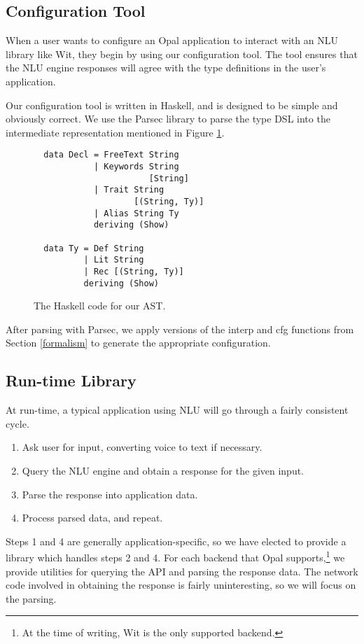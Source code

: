 \documentclass[twocolumn]{article}
\newcommand{\ff}[1]{\textsf{#1}}
\begin{document}
\subsection{Configuration Tool}
When a user wants to configure an Opal application to interact with an NLU
library like Wit, they begin by using our configuration tool. The tool ensures
that the NLU engine responses will agree with the type definitions in the user's
application.

Our configuration tool is written in Haskell, and is designed to be simple and
obviously correct. We use the Parsec library to parse the type DSL into the
intermediate representation mentioned in Figure \ref{fig:hs_ast}.\cite{parsec}

\begin{figure}[H]
\begin{verbatim}
  data Decl = FreeText String
            | Keywords String
                       [String]
            | Trait String
                    [(String, Ty)]
            | Alias String Ty
            deriving (Show)

  data Ty = Def String
          | Lit String
          | Rec [(String, Ty)]
          deriving (Show)
\end{verbatim}
  \caption{The Haskell code for our AST.}
  \label{fig:hs_ast}
\end{figure}

After parsing with Parsec, we apply versions of the \ff{interp} and \ff{cfg}
functions from Section \ref{formalism} to generate the appropriate
configuration.

\subsection{Run-time Library}
At run-time, a typical application using NLU will go through a fairly consistent
cycle.
\begin{enumerate}
\item Ask user for input, converting voice to text if necessary.
\item Query the NLU engine and obtain a response for the given input.
\item Parse the response into application data.
\item Process parsed data, and repeat.
\end{enumerate}
Steps 1 and 4 are generally application-specific, so we have elected to provide
a library which handles steps 2 and 4. For each backend that Opal
supports,\footnote{At the time of writing, Wit is the only supported backend.}
we provide utilities for querying the API and parsing the response data. The
network code involved in obtaining the response is fairly uninteresting, so we
will focus on the parsing.
\end{document}
